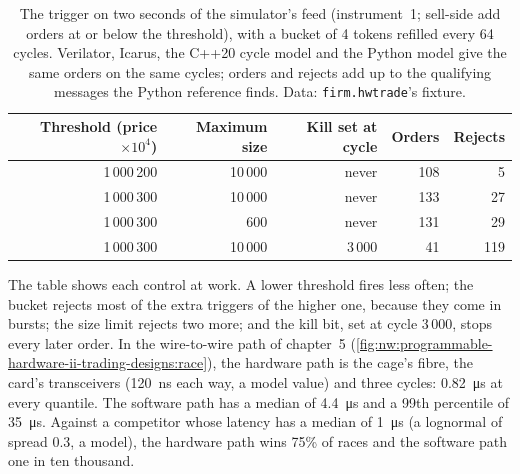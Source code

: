 \begin{table}[ht]
\centering\small
\begin{tabular}{rrrrr}
\toprule
Threshold (price $\times 10^4$) & Maximum size & Kill set at cycle & Orders & Rejects \\
\midrule
1\,000\,200 & 10\,000 & never & 108 & 5 \\
1\,000\,300 & 10\,000 & never & 133 & 27 \\
1\,000\,300 & 600 & never & 131 & 29 \\
1\,000\,300 & 10\,000 & 3\,000 & 41 & 119 \\
\bottomrule
\end{tabular}
\caption{The trigger on two seconds of the simulator's feed (instrument~1; sell-side add orders at or below the threshold), with a bucket
of 4 tokens refilled every 64 cycles. Verilator, Icarus, the C++20 cycle model and the Python model give the same orders on the same
cycles; orders and rejects add up to the qualifying messages the Python reference finds. Data: \texttt{firm.hwtrade}'s
fixture.}\label{tab:nw:programmable-hardware-ii-trading-designs:runs}
\end{table}

The table shows each control at work. A lower threshold fires less often; the bucket rejects most of the extra triggers of the higher
one, because they come in bursts; the size limit rejects two more; and the kill bit, set at cycle 3\,000, stops every later order. In
the wire-to-wire path of chapter~5 (\cref{fig:nw:programmable-hardware-ii-trading-designs:race}), the hardware path is the cage's fibre,
the card's transceivers (\qty{120}{\nano\second} each way, a model value) and three cycles: \qty{0.82}{\micro\second} at every quantile.
The software path has a median of \qty{4.4}{\micro\second} and a 99th percentile of \qty{35}{\micro\second}. Against a competitor whose
latency has a median of \qty{1}{\micro\second} (a lognormal of spread 0.3, a model), the hardware path wins 75\% of races and the software
path one in ten thousand.

